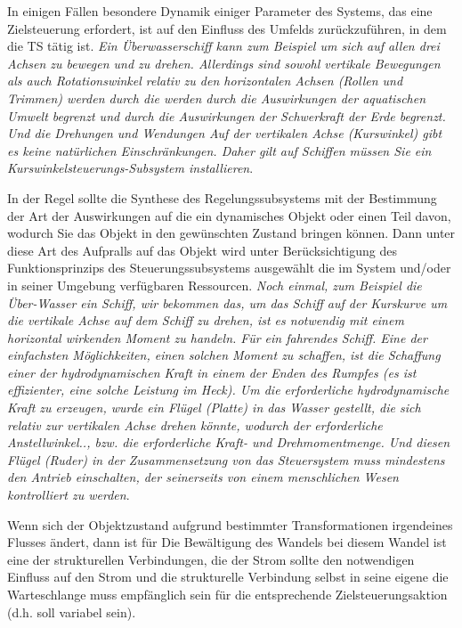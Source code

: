 \documentclass[11pt,a4paper]{article}
\begin{document}
In einigen Fällen besondere Dynamik einiger Parameter des Systems, das eine
Zielsteuerung erfordert, ist auf den Einfluss des Umfelds zurückzuführen, in
dem die TS tätig ist.  \emph{Ein Überwasserschiff kann zum Beispiel um sich
  auf allen drei Achsen zu bewegen und zu drehen. Allerdings sind sowohl
  vertikale Bewegungen als auch Rotationswinkel relativ zu den horizontalen
  Achsen (Rollen und Trimmen) werden durch die werden durch die Auswirkungen
  der aquatischen Umwelt begrenzt und durch die Auswirkungen der Schwerkraft
  der Erde begrenzt. Und die Drehungen und Wendungen Auf der vertikalen Achse
  (Kurswinkel) gibt es keine natürlichen Einschränkungen. Daher gilt auf
  Schiffen müssen Sie ein Kurswinkelsteuerungs-Subsystem installieren}.

In der Regel sollte die Synthese des Regelungssubsystems mit der Bestimmung
der Art der Auswirkungen auf die ein dynamisches Objekt oder einen Teil davon,
wodurch Sie das Objekt in den gewünschten Zustand bringen können. Dann unter
diese Art des Aufpralls auf das Objekt wird unter Berücksichtigung des
Funktionsprinzips des Steuerungssubsystems ausgewählt die im System und/oder
in seiner Umgebung verfügbaren Ressourcen.  \emph{Noch einmal, zum Beispiel
  die Über-Wasser ein Schiff, wir bekommen das, um das Schiff auf der
  Kurskurve um die vertikale Achse auf dem Schiff zu drehen, ist es notwendig
  mit einem horizontal wirkenden Moment zu handeln. Für ein fahrendes Schiff.
  Eine der einfachsten Möglichkeiten, einen solchen Moment zu schaffen, ist
  die Schaffung einer der hydrodynamischen Kraft in einem der Enden des
  Rumpfes (es ist effizienter, eine solche Leistung im Heck). Um die
  erforderliche hydrodynamische Kraft zu erzeugen, wurde ein Flügel (Platte)
  in das Wasser gestellt, die sich relativ zur vertikalen Achse drehen könnte,
  wodurch der erforderliche Anstellwinkel.., bzw. die erforderliche Kraft- und
  Drehmomentmenge. Und diesen Flügel (Ruder) in der Zusammensetzung von das
  Steuersystem muss mindestens den Antrieb einschalten, der seinerseits von
  einem menschlichen Wesen kontrolliert zu werden}.

Wenn sich der Objektzustand aufgrund bestimmter Transformationen irgendeines
Flusses ändert, dann ist für Die Bewältigung des Wandels bei diesem Wandel ist
eine der strukturellen Verbindungen, die der Strom sollte den notwendigen
Einfluss auf den Strom und die strukturelle Verbindung selbst in seine eigene
die Warteschlange muss empfänglich sein für die entsprechende
Zielsteuerungsaktion (d.h.  soll variabel sein).
\end{document}
